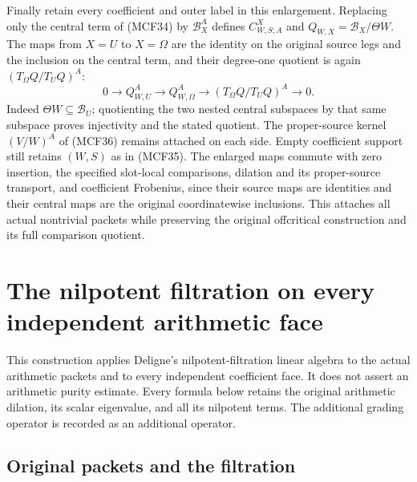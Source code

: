 \documentclass[11pt,a4paper]{article}
\begin{document}
Finally retain every coefficient and outer label in this enlargement.
Replacing only the central term of (MCF34) by $\mathscr B_X^A$
defines $C^X_{W,S;A}$ and $Q_{W,X}=\mathscr B_X/\Theta W$.
The maps from $X=U$ to $X=\Omega$ are the identity on the original
source legs and the inclusion on the central term, and their
degree-one quotient is again $(T_\Omega Q/T_UQ)^A$:
\[
0\longrightarrow Q_{W,U}^A\longrightarrow Q_{W,\Omega}^A
  \longrightarrow (T_\Omega Q/T_UQ)^A\longrightarrow0.
\tag{MCF41g}
\]
Indeed $\Theta W\subseteq\mathscr B_U$; quotienting the two nested
central subspaces by that same subspace proves injectivity and the
stated quotient.  The proper-source kernel $(V/W)^A$ of (MCF36)
remains attached on each side.  Empty coefficient support still
retains $(W,S)$ as in (MCF35).  The enlarged maps commute with zero
insertion, the specified slot-local comparisons, dilation and its
proper-source transport, and coefficient Frobenius, since their
source maps are identities and their central maps are the original
coordinatewise inclusions.  This attaches all actual nontrivial
packets while preserving the original offcritical construction and
its full comparison quotient.

\clearpage

\section{The nilpotent filtration on every independent arithmetic face}
\label{sec:mixed-face-monodromy}

This construction applies Deligne's nilpotent-filtration linear algebra to the
actual arithmetic packets and to every independent coefficient face. It does
not assert an arithmetic purity estimate. Every formula below retains the
original arithmetic dilation, its scalar eigenvalue, and all its nilpotent
terms. The additional grading operator is recorded as an additional operator.

\subsection{Original packets and the filtration}
\end{document}
